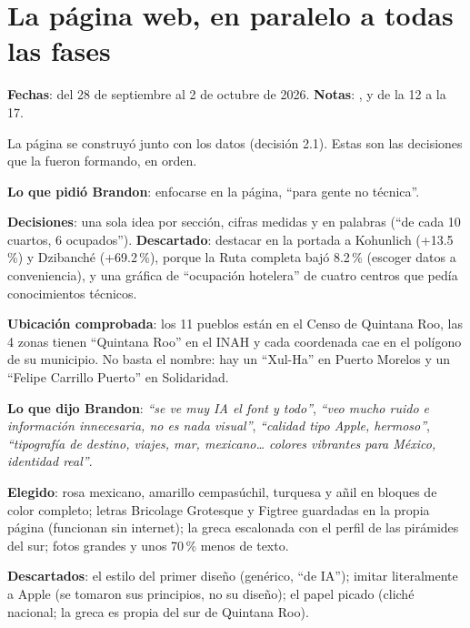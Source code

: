 \chapter{La página web, en paralelo a todas las fases}
\label{cap:d-pagina}
\textbf{Fechas}: del 28 de septiembre al 2 de octubre de 2026. \textbf{Notas}: ,  y
de la 12 a la 17.

La página se construyó junto con los datos (decisión 2.1). Estas son las decisiones que la fueron formando, en orden.

\begin{opciones}
\textbf{Lo que pidió Brandon}: enfocarse en la página, ``para gente no técnica''.

\textbf{Decisiones}: una sola idea por sección, cifras medidas y en palabras (``de cada 10 cuartos, 6 ocupados'').
\textbf{Descartado}: destacar en la portada a Kohunlich (+13.5\,\%) y Dzibanché (+69.2\,\%), porque la Ruta completa bajó
8.2\,\% (escoger datos a conveniencia), y una gráfica de ``ocupación hotelera'' de cuatro centros que pedía conocimientos
técnicos.

\textbf{Ubicación comprobada}: los 11 pueblos están en el Censo de Quintana Roo, las 4 zonas tienen ``Quintana Roo'' en el INAH
y cada coordenada cae en el polígono de su municipio. No basta el nombre: hay un ``Xul-Ha'' en Puerto Morelos y un ``Felipe
Carrillo Puerto'' en Solidaridad.
\end{opciones}

\begin{opciones}
\textbf{Lo que dijo Brandon}: \emph{``se ve muy IA el font y todo''}, \emph{``veo mucho ruido e información innecesaria, no es nada
visual''}, \emph{``calidad tipo Apple, hermoso''}, \emph{``tipografía de destino, viajes, mar, mexicano\dots{} colores vibrantes para
México, identidad real''}.

\textbf{Elegido}: rosa mexicano, amarillo cempasúchil, turquesa y añil en bloques de color completo; letras Bricolage
Grotesque y Figtree guardadas en la propia página (funcionan sin internet); la greca escalonada con el perfil de las pirámides
del sur; fotos grandes y unos 70\,\% menos de texto.

\textbf{Descartados}: el estilo del primer diseño (genérico, ``de IA''); imitar literalmente a Apple (se tomaron sus
principios, no su diseño); el papel picado (cliché nacional; la greca es propia del sur de Quintana Roo).
\end{opciones}

